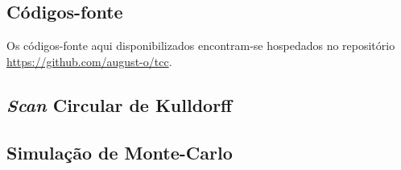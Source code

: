 \documentclass[
	12pt,				%
	openright,			%
	twoside,			%
	a4paper,			%
	english,			%
	french,				%
	spanish,			%
	brazil,				%
	]{abntex2}
\begin{document}
\postextual



%
%


\begin{apendicesenv}

\partanexos


\chapter{Códigos-fonte}
\label{apen:fonte}

Os códigos-fonte aqui disponibilizados encontram-se  hospedados no repositório \url{https://github.com/august-o/tcc}.


\section{\textit{Scan} Circular de Kulldorff}
\label{anex:scan-circular}



\section{Simulação de Monte-Carlo}


\end{apendicesenv}
\end{document}
